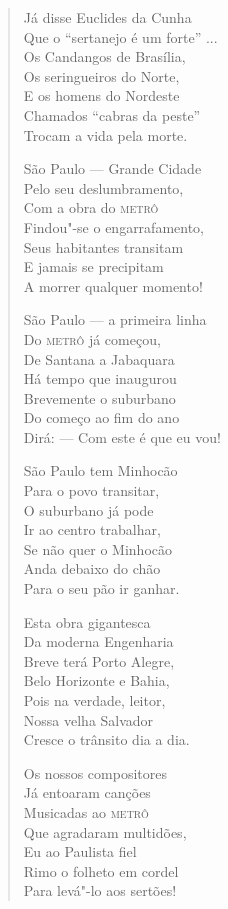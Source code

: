 \begin{verse}
Já disse Euclides da Cunha \\
Que o ``sertanejo é um forte'' ... \\
Os Candangos de Brasília, \\
Os seringueiros do Norte, \\
E os homens do Nordeste \\
Chamados ``cabras da peste'' \\
Trocam a vida pela morte. 

São Paulo ---  Grande Cidade \\
Pelo seu deslumbramento, \\
Com a obra do \textsc{metrô} \\
Findou"-se o engarrafamento, \\
Seus habitantes transitam \\
E jamais se precipitam \\
A morrer qualquer momento! 

São Paulo ---  a primeira linha \\
Do \textsc{metrô} já começou, \\
De Santana a Jabaquara \\
Há tempo que inaugurou \\
Brevemente o suburbano \\
Do começo ao fim do ano \\
Dirá: ---  Com este é que eu vou! 


São Paulo tem Minhocão \\
Para o povo transitar, \\
O suburbano já pode \\
Ir ao centro trabalhar, \\
Se não quer o Minhocão \\
Anda debaixo do chão \\
Para o seu pão ir ganhar. 

Esta obra gigantesca \\
Da moderna Engenharia \\
Breve terá Porto Alegre, \\
Belo Horizonte e Bahia, \\
Pois na verdade, leitor, \\
Nossa velha Salvador \\
Cresce o trânsito dia a dia. 

Os nossos compositores \\
Já entoaram canções \\
Musicadas ao \textsc{metrô} \\
Que agradaram multidões, \\
Eu ao Paulista fiel \\
Rimo o folheto em cordel \\
Para levá"-lo aos sertões! 


\end{verse}
